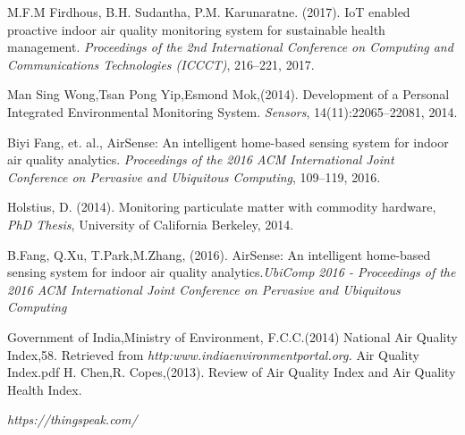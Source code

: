 \documentclass[10pt,a4paper]{report}
\begin{document}
\begin{enumerate}
 M.F.M Firdhous, B.H. Sudantha, P.M. Karunaratne. (2017). IoT enabled proactive indoor air quality monitoring system for sustainable health management. 
{\it Proceedings of the 2nd International Conference on Computing and Communications Technologies (ICCCT)}, 216--221, 2017.

 Man Sing Wong,Tsan Pong Yip,Esmond Mok,(2014). Development of a Personal Integrated Environmental Monitoring System. {\it Sensors}, 14(11):22065--22081, 2014. 

 Biyi Fang, et. al.,  AirSense: An intelligent home-based sensing system for indoor air quality analytics. {\it Proceedings of the 2016 ACM International Joint Conference on Pervasive and Ubiquitous Computing}, 109--119, 2016.

 Holstius, D. (2014). Monitoring particulate matter with commodity hardware, {\it PhD Thesis}, University of California Berkeley, 2014.

 B.Fang, Q.Xu, T.Park,M.Zhang, (2016). AirSense: An intelligent home-based sensing system for indoor air quality analytics.{\it UbiComp 2016 - Proceedings of the 2016 ACM International Joint Conference on Pervasive and Ubiquitous Computing}

 Government of India,Ministry of Environment, F.C.C.(2014) National Air Quality Index,58. Retrieved from {\it http:www.indiaenvironmentportal.org.} Air Quality Index.pdf
  H. Chen,R. Copes,(2013). Review of Air Quality Index and Air Quality Health Index.

 {\it https://thingspeak.com/}



\end{enumerate}
\end{document}
